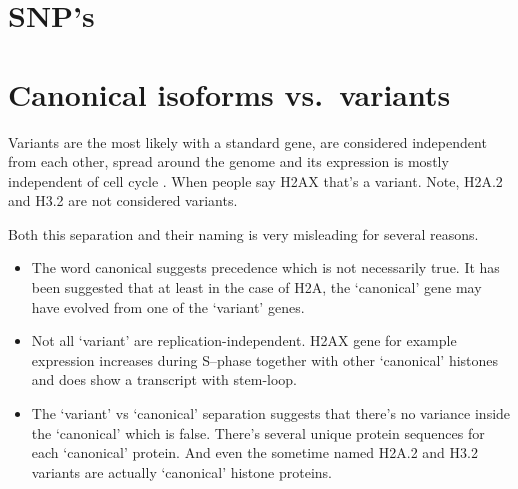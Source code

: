 \documentclass[10pt,a4paper,twocolumn,article]{memoir}
\newcommand{\addref}[1][]{\todo[color=red!40,size=\tiny]{Add reference: #1}}
\begin{document}
  \section{SNP's}

  \section{Canonical isoforms vs.~variants}

    Variants are the most likely with a standard gene, are considered independent from each other,
    spread around the genome and its expression is mostly independent of cell cycle . When people say H2AX that's
    a variant. Note, H2A.2 and H3.2 are not considered variants.

    Both this separation and their naming is very misleading 
    for several reasons.
    \begin{itemize}
      \item The word canonical suggests precedence which is not necessarily true. It has been
            suggested that at least in the case of H2A, the `canonical' gene may have evolved
            from one of the `variant' genes\addref.
      \item Not all `variant' are replication-independent. H2AX gene for example expression
            increases during S--phase together with other `canonical' histones and does show
            a transcript with stem-loop.
      \item The `variant' vs `canonical' separation suggests that there's no variance inside
            the `canonical' which is false. There's several unique protein sequences for each
            `canonical' protein. And even the sometime named H2A.2 and H3.2 variants are actually
            `canonical' histone proteins.
    \end{itemize}
\end{document}
